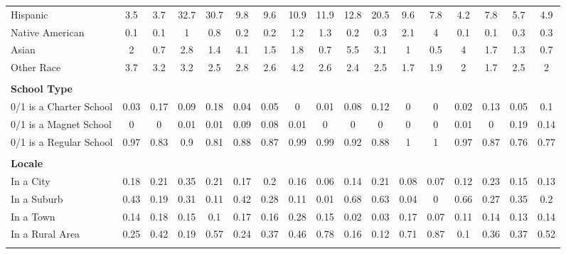 \begin{tabular*}{\linewidth}{@{\extracolsep{\fill} } lcccccccccccccccc}
\hspace{0.2cm}Hispanic&3.5&3.7&32.7&30.7&9.8&9.6&10.9&11.9&12.8&20.5&9.6&7.8&4.2&7.8&5.7&4.9\\%
\hspace{0.2cm}Native American&0.1&0.1&1&0.8&0.2&0.2&1.2&1.3&0.2&0.3&2.1&4&0.1&0.1&0.3&0.3\\%
\hspace{0.2cm}Asian&2&0.7&2.8&1.4&4.1&1.5&1.8&0.7&5.5&3.1&1&0.5&4&1.7&1.3&0.7\\%
\hspace{0.2cm}Other Race&3.7&3.2&3.2&2.5&2.8&2.6&4.2&2.6&2.4&2.5&1.7&1.9&2&1.7&2.5&2\\%
&&&&&&&&&&&&&&&&\\%
\multicolumn{17}{l}{\bfseries School Type}\\%
\hspace{0.2cm}0/1 is a Charter School&0.03&0.17&0.09&0.18&0.04&0.05&0&0.01&0.08&0.12&0&0&0.02&0.13&0.05&0.1\\%
\hspace{0.2cm}0/1 is a Magnet School&0&0&0.01&0.01&0.09&0.08&0.01&0&0&0&0&0&0.01&0&0.19&0.14\\%
\hspace{0.2cm}0/1 is a Regular School&0.97&0.83&0.9&0.81&0.88&0.87&0.99&0.99&0.92&0.88&1&1&0.97&0.87&0.76&0.77\\%
&&&&&&&&&&&&&&&&\\%
\multicolumn{17}{l}{\bfseries Locale}\\%
\hspace{0.2cm}In a City&0.18&0.21&0.35&0.21&0.17&0.2&0.16&0.06&0.14&0.21&0.08&0.07&0.12&0.23&0.15&0.13\\%
\hspace{0.2cm}In a Suburb&0.43&0.19&0.31&0.11&0.42&0.28&0.11&0.01&0.68&0.63&0.04&0&0.66&0.27&0.35&0.2\\%
\hspace{0.2cm}In a Town&0.14&0.18&0.15&0.1&0.17&0.16&0.28&0.15&0.02&0.03&0.17&0.07&0.11&0.14&0.13&0.14\\%
\hspace{0.2cm}In a Rural Area&0.25&0.42&0.19&0.57&0.24&0.37&0.46&0.78&0.16&0.12&0.71&0.87&0.1&0.36&0.37&0.52\\%
&&&&&&&&&&&&&&&&\\%
\hline%
\end{tabular*}